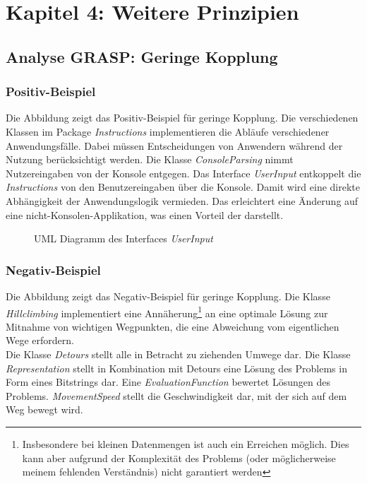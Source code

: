 \section{Kapitel 4: Weitere Prinzipien}

\subsection{Analyse GRASP: Geringe Kopplung}


\subsubsection{Positiv-Beispiel}

Die Abbildung zeigt das Positiv-Beispiel für geringe Kopplung.
Die verschiedenen Klassen im Package \textit{Instructions} implementieren die Abläufe verschiedener Anwendungsfälle. Dabei müssen Entscheidungen von Anwendern während der Nutzung berücksichtigt werden.
Die Klasse \textit{ConsoleParsing} nimmt Nutzereingaben von der Konsole entgegen.
 Das Interface \textit{UserInput} entkoppelt die \textit{Instructions} von den Benutzereingaben über die Konsole.
Damit wird eine direkte Abhängigkeit der Anwendungslogik vermieden.
 Das erleichtert eine Änderung auf eine nicht-Konsolen-Applikation, was einen Vorteil der darstellt. 

\begin{figure}[H]
  \label{fig:GKGut}
  \centering
  
  \caption{UML Diagramm des Interfaces \textit{UserInput}}
\end{figure}

\subsubsection{Negativ-Beispiel}

Die Abbildung zeigt das Negativ-Beispiel für geringe Kopplung.
Die Klasse \textit{Hillclimbing} implementiert eine Annäherung\footnote{Insbesondere bei kleinen Datenmengen ist auch ein Erreichen möglich. Dies kann aber aufgrund der Komplexität des Problems (oder möglicherweise meinem fehlenden Verständnis) nicht garantiert werden} an eine optimale Lösung zur Mitnahme von wichtigen Wegpunkten, die eine Abweichung vom eigentlichen Wege erfordern.
\\

Die Klasse \textit{Detours} stellt alle in Betracht zu ziehenden Umwege dar. 
Die Klasse \textit{Representation} stellt in Kombination mit Detours eine Lösung des Problems in Form eines Bitstrings dar.
Eine \textit{EvaluationFunction} bewertet Lösungen des Problems.
\textit{MovementSpeed} stellt die Geschwindigkeit dar, mit der sich auf dem Weg bewegt wird.

